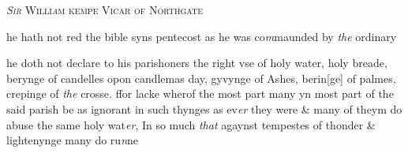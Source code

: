 \documentclass[12pt, a4paper]{book}
\begin{document}
            
               
				\begin{center} \begin{large} {\scshape 
               	\textit{Sir} Willi\textit{a}m kempe Vicar of Northgate} \end{large} \end{center}
			

 
		\ifthenelse{\isodd{\thepage}}
		{\reversemarginpar}
		{\normalmarginpar}
		he hath not red the bible syns pentecost as he was co\textit{m}maunded
 by \textit{the} ordinary
            	
            		
				\marginpar[\vspace{0.5cm}{\textcolor{Gray}{ceremonies}}]{}
			
            		
		\ifthenelse{\isodd{\thepage}}
		{\reversemarginpar}
		{\normalmarginpar}
		he doth not declare  to his parishoners
			 the right vse of holy water, holy breade,
 berynge of candelles opon candlemas day, gyvynge of Ashes, berin[ge]
 of palmes, crepinge of \textit{the} crosse. ffor lacke wherof the most part
			 many yn most part of the
 said parish be as ignorant in such thynges as ev\textit{er} they were
 \& many of theym do abuse the same holy wat\textit{er}, In so much \textit{that}
 agaynst tempestes of thonder \& lightenynge many do ru\textit{n}ne
            	


\dotfill
						\newpage {} \subsection*{}  \subsection*{}  \subsection*{}  \subsection*{}
\end{document}
